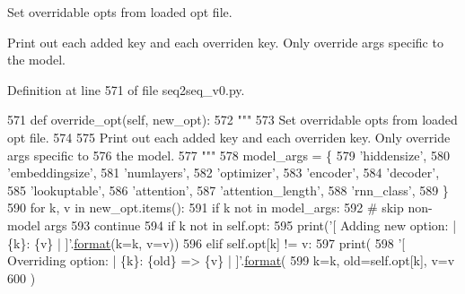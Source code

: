 \begin{DoxyVerb}Set overridable opts from loaded opt file.

Print out each added key and each overriden key. Only override args specific to
the model.
\end{DoxyVerb}
 

Definition at line 571 of file seq2seq\+\_\+v0.\+py.


\begin{DoxyCode}
571     \textcolor{keyword}{def }override\_opt(self, new\_opt):
572         \textcolor{stringliteral}{"""}
573 \textcolor{stringliteral}{        Set overridable opts from loaded opt file.}
574 \textcolor{stringliteral}{}
575 \textcolor{stringliteral}{        Print out each added key and each overriden key. Only override args specific to}
576 \textcolor{stringliteral}{        the model.}
577 \textcolor{stringliteral}{        """}
578         model\_args = \{
579             \textcolor{stringliteral}{'hiddensize'},
580             \textcolor{stringliteral}{'embeddingsize'},
581             \textcolor{stringliteral}{'numlayers'},
582             \textcolor{stringliteral}{'optimizer'},
583             \textcolor{stringliteral}{'encoder'},
584             \textcolor{stringliteral}{'decoder'},
585             \textcolor{stringliteral}{'lookuptable'},
586             \textcolor{stringliteral}{'attention'},
587             \textcolor{stringliteral}{'attention\_length'},
588             \textcolor{stringliteral}{'rnn\_class'},
589         \}
590         \textcolor{keywordflow}{for} k, v \textcolor{keywordflow}{in} new\_opt.items():
591             \textcolor{keywordflow}{if} k \textcolor{keywordflow}{not} \textcolor{keywordflow}{in} model\_args:
592                 \textcolor{comment}{# skip non-model args}
593                 \textcolor{keywordflow}{continue}
594             \textcolor{keywordflow}{if} k \textcolor{keywordflow}{not} \textcolor{keywordflow}{in} self.opt:
595                 print(\textcolor{stringliteral}{'[ Adding new option: | \{k\}: \{v\} | ]'}.\hyperlink{namespaceparlai_1_1chat__service_1_1services_1_1messenger_1_1shared__utils_a32e2e2022b824fbaf80c747160b52a76}{format}(k=k, v=v))
596             \textcolor{keywordflow}{elif} self.opt[k] != v:
597                 print(
598                     \textcolor{stringliteral}{'[ Overriding option: | \{k\}: \{old\} => \{v\} | ]'}.\hyperlink{namespaceparlai_1_1chat__service_1_1services_1_1messenger_1_1shared__utils_a32e2e2022b824fbaf80c747160b52a76}{format}(
599                         k=k, old=self.opt[k], v=v
600                     )

\end{DoxyCode}
